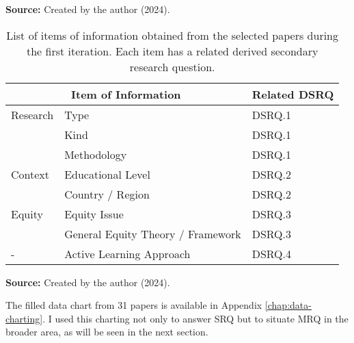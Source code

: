 \begin{table}[htb]
\begin{tabular}{
    m{7cm}|
    m{7cm}
}
    \hline
    
\end{tabular}

  \par\medskip\ABNTEXfontereduzida\selectfont\textbf{Source:} Created by the author (2024). \par\medskip
\end{table}

\begin{table}[htb]
\caption{List of items of information obtained from the selected papers during the first iteration. Each item has a related derived secondary research question.}
\label{tbl:papers-chart}
\centering
{}
\begin{tabular}{
    m{2.5cm}|
    m{7cm}|
    m{3cm}
}
    \hline
    \multicolumn{2}{c}{Item of Information} &
    Related \gls{DSRQ}\\
    \hline
    Research &
    Type & \gls{DSRQ}.1 \\
    & Kind & \gls{DSRQ}.1 \\
    & Methodology & \gls{DSRQ}.1 \\
    \hline
    Context &
    Educational Level & \gls{DSRQ}.2 \\
    & Country / Region & \gls{DSRQ}.2 \\
    \hline
    Equity & 
    Equity Issue & \gls{DSRQ}.3 \\
    & General Equity Theory / Framework & \gls{DSRQ}.3 \\
    \hline
    - &
    Active Learning Approach & \gls{DSRQ}.4\\
    \hline
    
\end{tabular}

\par\medskip\ABNTEXfontereduzida\selectfont\textbf{Source:} Created by the author (2024). \par\medskip

\end{table}

The filled data chart from 31 papers is available in Appendix \ref{chap:data-charting}. I used this charting not only to answer \gls{SRQ} but to situate \gls{MRQ} in the broader area, as will be seen in the next section.